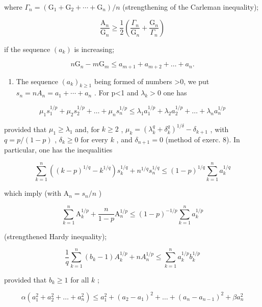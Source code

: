 where \(\Gamma_{n}=(\mathrm{G}_{1}+\mathrm{G}_{2}+\cdots+\mathrm{G}_{n})/n\) (strengthening of the Carleman inequality);

\[
\frac {\mathrm{A} _ {n}}{\mathrm{G} _ {n}} \geqslant \frac {1}{2} \left(\frac {\Gamma_ {n}}{\mathrm{G} _ {n}} + \frac {\mathrm{G} _ {n}}{\Gamma_ {n}}\right)
\]

if the sequence \((a_{k})\) is increasing;

\[
n \mathrm{G} _ {n} - m \mathrm{G} _ {m} \leqslant a _ {m + 1} + a _ {m + 2} + \dots + a _ {n}.
\]

\begin{enumerate}
\def\labelenumi{\arabic{enumi})}
\setcounter{enumi}{9}
\tightlist
\item
  The sequence \((a_{k})_{k\geqslant1}\) being formed of numbers \textgreater0, we put \(s_{n}=nA_{n}=a_{1}+\cdots+a_{n}\) . For p\textless1 and \(\lambda_{k}>0\) one has
\end{enumerate}

\[
\mu_ {1} s _ {1} ^ {1 / p} + \mu_ {2} s _ {2} ^ {1 / p} + \dots + \mu_ {n} s _ {n} ^ {1 / p} \leqslant \lambda_ {1} a _ {1} ^ {1 / p} + \lambda_ {2} a _ {2} ^ {1 / p} + \dots + \lambda_ {n} a _ {n} ^ {1 / p}
\]

provided that \(\mu_1 \geqslant \lambda_1\) and, for \(k \geqslant 2\) , \(\mu_k = \left( \lambda_k^q + \delta_k^q \right)^{1/\delta} - \delta_{k+1}\) , with \(q = p/(1-p)\) , \(\delta_k \geqslant 0\) for every \(k\) , and \(\delta_{n+1} = 0\) (method of exerc. 8). In particular, one has the inequalities

\[
\sum_ {k = 1} ^ {n} \left((k - p) ^ {1 / q} - k ^ {1 / q}\right) s _ {k} ^ {1 / q} + n ^ {1 / q} s _ {n} ^ {1 / q} \leqslant (1 - p) ^ {1 / q} \sum_ {k = 1} ^ {n} a _ {k} ^ {1 / q}
\]

which imply (with \(\mathrm{A}_n = s_n / n\) )

\[
\sum_ {k = 1} ^ {n} \mathrm{A} _ {k} ^ {1 / p} + \frac {n}{1 - p} \mathrm{A} _ {n} ^ {1 / p} \leqslant (1 - p) ^ {- 1 / p} \sum_ {k = 1} ^ {n} a _ {k} ^ {1 / p}
\]

(strengthened Hardy inequality);

\[
\frac {1}{q} \sum_ {k = 1} ^ {n} \left(b _ {k} - 1\right) A _ {k} ^ {1 / p} + n A _ {n} ^ {1 / p} \leqslant \sum_ {k = 1} ^ {n} a _ {k} ^ {1 / p} b _ {k} ^ {1 / p}
\]

provided that \(b_{k} \geqslant 1\) for all \(k\) ;

\[
\alpha \left(a _ {1} ^ {2} + a _ {2} ^ {2} + \dots + a _ {n} ^ {2}\right) \leqslant a _ {1} ^ {2} + \left(a _ {2} - a _ {1}\right) ^ {2} + \dots + \left(a _ {n} - a _ {n - 1}\right) ^ {2} + \beta a _ {n} ^ {2}
\]


